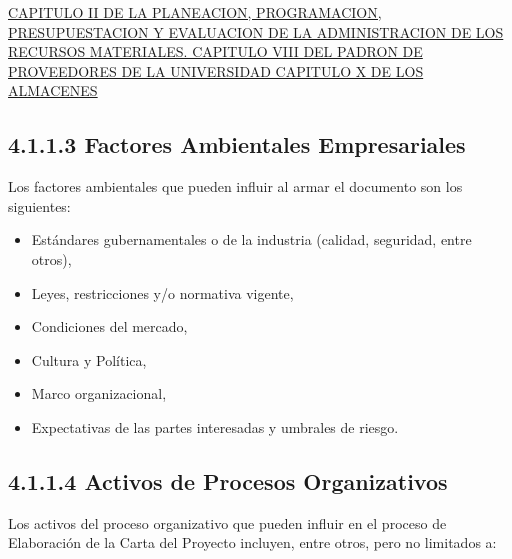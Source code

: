 \documentclass[letterpaper,12pt,openright,oneside]{article}
\theoremstyle{plain}
\begin{document}
\href{https://www.uaq.mx/leyes/regadqu.pdf}{CAPITULO II DE LA PLANEACION, PROGRAMACION, PRESUPUESTACION Y EVALUACION DE LA ADMINISTRACION DE LOS RECURSOS MATERIALES. CAPITULO VIII DEL PADRON DE PROVEEDORES DE LA UNIVERSIDAD CAPITULO X
DE LOS ALMACENES}

% 
% 
\subsection*{4.1.1.3 Factores Ambientales Empresariales}

Los factores ambientales que pueden influir al armar el documento son los siguientes:

\begin{itemize}
    \item Estándares gubernamentales o de la industria (calidad, seguridad, entre otros),
    \item Leyes, restricciones y/o normativa vigente,
    \item Condiciones del mercado,
    \item Cultura y Política,
    \item Marco organizacional,
    \item Expectativas de las partes interesadas y umbrales de riesgo.
\end{itemize}
% 
% 
\subsection*{4.1.1.4 Activos de Procesos Organizativos}

Los activos del proceso organizativo que pueden influir en el proceso de Elaboración de la Carta del Proyecto incluyen, entre otros, pero no limitados a:
\end{document}
